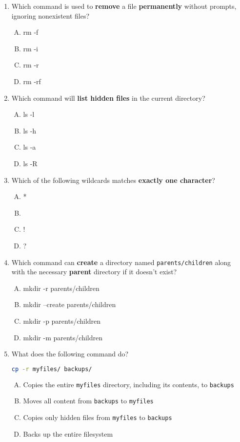 \documentclass[a4paper]{report}
\begin{document}
\begin{enumerate}[1.]
    \item Which command is used to \textbf{remove} a file \textbf{permanently} without prompts, ignoring nonexistent files?  
    \begin{enumerate}[A)]
        \item rm -f  
        \item rm -i  
        \item rm -r  
        \item rm -rf  
    \end{enumerate}

    \item Which command will \textbf{list hidden files} in the current directory?  
    \begin{enumerate}[A)]
        \item ls -l  
        \item ls -h  
        \item ls -a  
        \item ls -R  
    \end{enumerate}

    \item Which of the following wildcards matches \textbf{exactly one character}?  
    \begin{enumerate}[A)]
        \item *  
        \item [ ]  
        \item !  
        \item ?  
    \end{enumerate}

    \item Which command can \textbf{create} a directory named \texttt{parents/children} along with the necessary \textbf{parent} directory if it doesn’t exist?  
    \begin{enumerate}[A)]
        \item mkdir -r parents/children  
        \item mkdir --create parents/children  
        \item mkdir -p parents/children  
        \item mkdir -m parents/children  
    \end{enumerate}

    \item What does the following command do?  
    \begin{lstlisting}[language=bash]
    cp -r myfiles/ backups/
    \end{lstlisting}
    \begin{enumerate}[A)]
        \item Copies the entire \texttt{myfiles} directory, including its contents, to \texttt{backups}  
        \item Moves all content from \texttt{backups} to \texttt{myfiles}  
        \item Copies only hidden files from \texttt{myfiles} to \texttt{backups}  
        \item Backs up the entire filesystem  
    \end{enumerate}


\end{enumerate}
\end{document}
